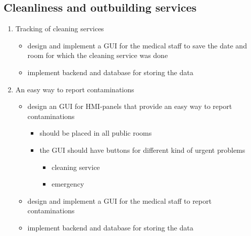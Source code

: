 \subsection{Cleanliness and outbuilding services}
\label{sec:org14b7883}
\begin{enumerate}
\item Tracking of cleaning services
\label{sec:org20c4fcd}
\begin{itemize}
\item design and implement a GUI for the medical staff to save the date and room for which the cleaning service was done
\item implement backend and database for storing the data
\end{itemize}
\item An easy way to report contaminations
\label{sec:orgc4fa354}
\begin{itemize}
\item design an GUI for HMI-panels that provide an easy way to report contaminations
\begin{itemize}
\item should be placed in all public rooms
\item the GUI should have buttons for different kind of urgent problems
\begin{itemize}
\item cleaning service
\item emergency
\end{itemize}
\end{itemize}
\item design and implement a GUI for the medical staff to report contaminations
\item implement backend and database for storing the data
\end{itemize}
\end{enumerate}
